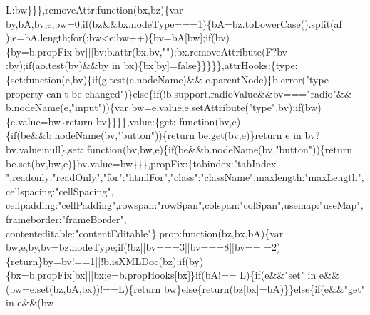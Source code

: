 \begin{DoxyCode}
      L:bw\}\}\},removeAttr:\textcolor{keyword}{function}(bx,bz)\{var by,bA,bv,e,bw=0;\textcolor{keywordflow}{if}(bz&&bx.nodeType===1)\{bA=bz.toLowerCase().split(af
      );e=bA.length;\textcolor{keywordflow}{for}(;bw<e;bw++)\{bv=bA[bw];\textcolor{keywordflow}{if}(bv)\{by=b.propFix[bv]||bv;b.attr(bx,bv,\textcolor{stringliteral}{""});bx.removeAttribute(F?bv
      :by);\textcolor{keywordflow}{if}(ao.test(bv)&&by in bx)\{bx[by]=\textcolor{keyword}{false}\}\}\}\}\},attrHooks:\{type:\{\textcolor{keyword}{set}:\textcolor{keyword}{function}(e,bv)\{\textcolor{keywordflow}{if}(g.test(e.nodeName)&&
      e.parentNode)\{b.error(\textcolor{stringliteral}{"type property can't be changed"})\}\textcolor{keywordflow}{else}\{\textcolor{keywordflow}{if}(!b.support.radioValue&&bv===\textcolor{stringliteral}{"radio"}&&
      b.nodeName(e,\textcolor{stringliteral}{"input"}))\{var bw=e.value;e.setAttribute(\textcolor{stringliteral}{"type"},bv);\textcolor{keywordflow}{if}(bw)\{e.value=bw\}\textcolor{keywordflow}{return} bv\}\}\}\},value:\{\textcolor{keyword}{get}:\textcolor{keyword}{
      function}(bv,e)\{\textcolor{keywordflow}{if}(be&&b.nodeName(bv,\textcolor{stringliteral}{"button"}))\{\textcolor{keywordflow}{return} be.get(bv,e)\}\textcolor{keywordflow}{return} e in bv?bv.value:null\},\textcolor{keyword}{set}:\textcolor{keyword}{
      function}(bv,bw,e)\{\textcolor{keywordflow}{if}(be&&b.nodeName(bv,\textcolor{stringliteral}{"button"}))\{\textcolor{keywordflow}{return} be.set(bv,bw,e)\}bv.value=bw\}\}\},propFix:\{tabindex:\textcolor{stringliteral}{"tabIndex
      "},readonly:\textcolor{stringliteral}{"readOnly"},\textcolor{stringliteral}{"for"}:\textcolor{stringliteral}{"htmlFor"},\textcolor{stringliteral}{"class"}:\textcolor{stringliteral}{"className"},maxlength:\textcolor{stringliteral}{"maxLength"},cellspacing:\textcolor{stringliteral}{"cellSpacing"},
      cellpadding:\textcolor{stringliteral}{"cellPadding"},rowspan:\textcolor{stringliteral}{"rowSpan"},colspan:\textcolor{stringliteral}{"colSpan"},usemap:\textcolor{stringliteral}{"useMap"},frameborder:\textcolor{stringliteral}{"frameBorder"},
      contenteditable:\textcolor{stringliteral}{"contentEditable"}\},prop:\textcolor{keyword}{function}(bz,bx,bA)\{var bw,e,by,bv=bz.nodeType;\textcolor{keywordflow}{if}(!bz||bv===3||bv===8||bv==
      =2)\{\textcolor{keywordflow}{return}\}by=bv!==1||!b.isXMLDoc(bz);\textcolor{keywordflow}{if}(by)\{bx=b.propFix[bx]||bx;e=b.propHooks[bx]\}\textcolor{keywordflow}{if}(bA!==
      L)\{\textcolor{keywordflow}{if}(e&&\textcolor{stringliteral}{"set"} in e&&(bw=e.set(bz,bA,bx))!==L)\{\textcolor{keywordflow}{return} bw\}\textcolor{keywordflow}{else}\{\textcolor{keywordflow}{return}(bz[bx]=bA)\}\}\textcolor{keywordflow}{else}\{\textcolor{keywordflow}{if}(e&&\textcolor{stringliteral}{"get"} in e&&(bw

\end{DoxyCode}
